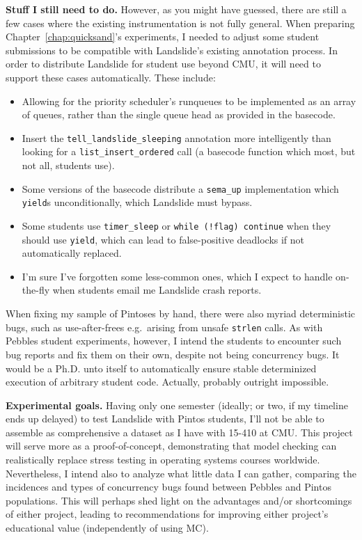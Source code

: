 {\bf Stuff I still need to do.}
However, as you might have guessed, there are still a few cases where the existing instrumentation is not fully general.
When preparing Chapter~\ref{chap:quicksand}'s experiments, I needed to adjust some student submissions to be compatible with Landslide's existing annotation process.
In order to distribute Landslide for student use beyond CMU, it will need to support these cases automatically.
These include:
\begin{itemize}
	\item Allowing for the priority scheduler's runqueues to be implemented as an array of queues, rather than the single queue head as provided in the basecode.
	\item Insert the {\tt tell\_landslide\_sleeping} annotation more intelligently than looking for a {\tt list\_insert\_ordered} call (a basecode function which most, but not all, students use).
	\item Some versions of the basecode distribute a {\tt sema\_up} implementation which {\tt yield}s unconditionally, which Landslide must bypass.
	\item Some students use {\tt timer\_sleep} or {\tt while (!flag) continue} when they should use {\tt yield}, which can lead to false-positive deadlocks if not automatically replaced.
	\item I'm sure I've forgotten some less-common ones, which I expect to handle on-the-fly when students email me Landslide crash reports.
\end{itemize}
When fixing my sample of Pintoses by hand, there were also myriad deterministic bugs, such as use-after-frees e.g.~arising from unsafe {\tt strlen} calls.
As with Pebbles student experiments, however, I intend the students to encounter such bug reports and fix them on their own, despite not being concurrency bugs.
It would be a Ph.D. unto itself to automatically ensure stable determinized execution of arbitrary student code.
Actually, probably outright impossible.

{\bf Experimental goals.}
Having only one semester (ideally; or two, if my timeline ends up delayed) to test Landslide with Pintos students,
I'll not be able to assemble as comprehensive a dataset as I have with 15-410 at CMU.
This project will serve more as a proof-of-concept, demonstrating that model checking can realistically replace stress testing in operating systems courses worldwide.
Nevertheless, I intend also to analyze what little data I can gather, comparing the incidences and types of concurrency bugs found between Pebbles and Pintos populations.
This will perhaps shed light on the advantages and/or shortcomings of either project,
leading to recommendations for improving either project's educational value (independently of using MC).


